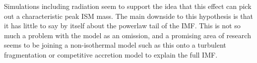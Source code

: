 Simulations including radiation seem to support the idea that this effect can pick out a characteristic peak ISM mass. The main downside to this hypothesis is that it has little to say by itself about the powerlaw tail of the IMF. This is not so much a problem with the model as an omission, and a promising area of research seems to be joining a non-isothermal model such as this onto a turbulent fragmentation or competitive accretion model to explain the full IMF.

